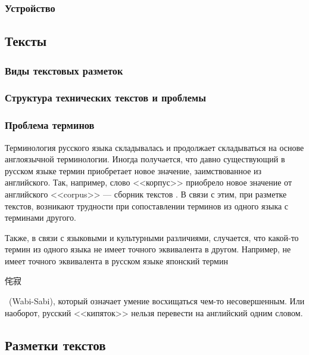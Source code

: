 \subsubsection{Устройство}

\subsection{Тексты}

\subsubsection{Виды текстовых разметок}

\subsubsection{Структура технических текстов и проблемы}

\subsubsection{Проблема терминов}

Терминология русского языка складывалась и продолжает складываться на основе англоязычной терминологии.
Иногда получается, что давно существующий в русском языке термин приобретает новое значение, заимствованное из английского.
Так, например, слово <<корпус>> приобрело новое значение от английского <<corpus>> --- {сборник текстов} \cite{kl}.
В связи с этим, при разметке текстов, возникают трудности при сопоставлении терминов из одного языка с терминами другого.

Также, в связи с языковыми и культурными различиями, случается, что какой-то термин из одного языка не имеет точного эквивалента в другом.
Например, не имеет точного эквивалента в русском языке японский термин \begin{CJK*}{UTF8}{min}
侘寂
\end{CJK*}~(Wabi-Sabi), который означает {умение восхищаться чем-то несовершенным}.
Или наоборот, русский <<кипяток>> нельзя перевести на английский одним словом.


\subsection{Разметки текстов}

